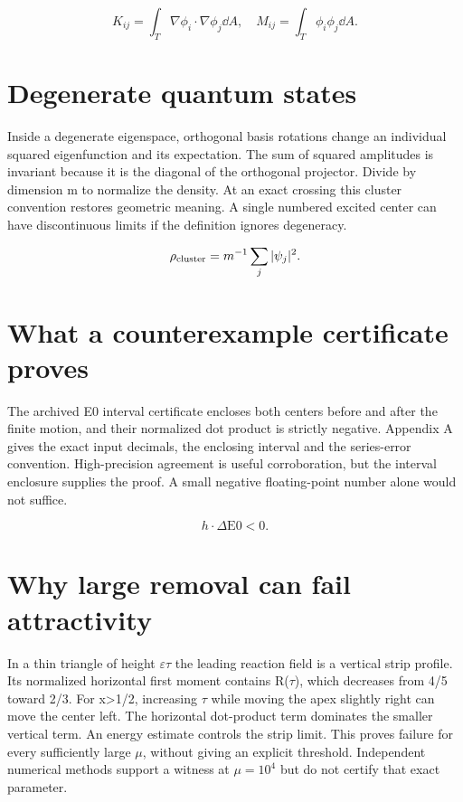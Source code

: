 \documentclass[11pt,oneside,openany]{book}
\begin{document}
\[K_{ij}=\int_T\nabla\phi_i\cdot\nabla\phi_j\dd A,\quad M_{ij}=\int_T\phi_i\phi_j\dd A.\]


\section{Degenerate quantum states}\label{sec:slide99}

Inside a degenerate eigenspace, orthogonal basis rotations change an individual squared eigenfunction and its expectation. The sum of squared amplitudes is invariant because it is the diagonal of the orthogonal projector. Divide by dimension m to normalize the density. At an exact crossing this cluster convention restores geometric meaning. A single numbered excited center can have discontinuous limits if the definition ignores degeneracy.


\[\rho_{\rm cluster}=m^{-1}\sum_j|\psi_j|^2.\]


\section{What a counterexample certificate proves}\label{sec:slide100}

The archived E0 interval certificate encloses both centers
before and after the finite motion, and their normalized dot product
is strictly negative. Appendix A gives the exact input decimals,
the enclosing interval and the series-error convention.
High-precision agreement is useful corroboration, but the interval
enclosure supplies the proof. A small negative floating-point number
alone would not suffice.


\[h\cdot\Delta\mathrm{E0}<0.\]


\section{Why large removal can fail attractivity}\label{sec:slide101}

In a thin triangle of height \ensuremath{\varepsilon}\ensuremath{\tau} the leading reaction field is a vertical strip profile. Its normalized horizontal first moment contains R(\ensuremath{\tau}), which decreases from 4/5 toward 2/3. For x>1/2, increasing \ensuremath{\tau} while moving the apex slightly right can move the center left. The horizontal dot-product term dominates the smaller vertical term. An energy estimate controls the strip limit. This proves failure for every sufficiently large \ensuremath{\mu}, without giving an explicit threshold. Independent numerical methods support a witness at $\mu=10^4$ but do not certify that exact parameter.
\end{document}
